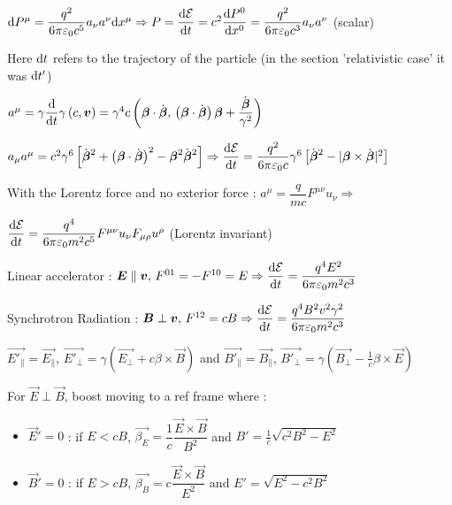 \item $\textrm{d} P^{\mu } =  \dfrac{q^2}{6\pi \varepsilon_0 c^5}a_{\nu}a^{\nu} \textrm{d} x^{\mu} \Rightarrow P = \dfrac{\textrm{d} \mathcal{E}}{\textrm{d} t} = c^2 \dfrac{\textrm{d} P^0}{\textrm{d} x^0} = \dfrac{q^2}{6\pi\varepsilon_0c^3} a_{\nu}a^{\nu}$ (scalar)

\item Here $\textrm{d} t$ refers to the trajectory of the particle (in the section 'relativistic case' it was $\textrm{d} t'$)

\item $a^{\mu} = \gamma \dfrac{\textrm{d}}{\textrm{d} t} \gamma \left(c, \mbox{\boldmath$v$}\right) = \gamma^4 c \left(\mbox{\boldmath$\beta$}\cdot\dot{\mbox{\boldmath$\beta$}}, \, \left(\mbox{\boldmath$\beta$}\cdot\dot{\mbox{\boldmath$\beta$}}\right)\mbox{\boldmath$\beta$} + \dfrac{\dot{\mbox{\boldmath$\beta$}}}{\gamma^2}\right)$

\item $a_{\mu}a^{\mu} = c^2\gamma^6 \left[ \dot{\mbox{\boldmath$\beta$}}^2 + \left(\mbox{\boldmath$\beta$}\cdot\dot{\mbox{\boldmath$\beta$}}\right)^2 -\mbox{\boldmath$\beta$}^2 \dot{\mbox{\boldmath$\beta$}}^2   \right] \Rightarrow \dfrac{\textrm{d} \mathcal{E}}{\textrm{d} t} = \dfrac{q^2}{6\pi\varepsilon_0c}\gamma^6 \left[\dot{\mbox{\boldmath$\beta$}}^2 - |\mbox{\boldmath$\beta$} \times \dot{\mbox{\boldmath$\beta$}}|^2\right]$

\item[] With the Lorentz force and no exterior force : $a^{\mu} = \dfrac{q}{mc} F^{\mu\nu}u_{\nu} \Rightarrow $

\item $\dfrac{\textrm{d} \mathcal{E}}{\textrm{d} t} =  \dfrac{q^4}{6\pi\varepsilon_0m^2c^5}F^{\mu\nu}u_{\nu}F_{\mu\rho}u^{\rho}$ \quad (Lorentz invariant)
\squishend
{}

\squishlist
\item Linear accelerator : $ \mbox{\boldmath$E$} \parallel \mbox{\boldmath$v$}, \, F^{01} = -F^{10} = E \Rightarrow \dfrac{\textrm{d} \mathcal{E}}{\textrm{d} t} = \dfrac{q^4E^2}{6\pi\varepsilon_0m^2c^3}$

\item Synchrotron Radiation : $\mbox{\boldmath$B$} \perp \mbox{\boldmath$v$}, \, F^{12} = cB \Rightarrow \dfrac{\textrm{d} \mathcal{E}}{\textrm{d} t} = \dfrac{q^4B^2v^2\gamma^2}{6\pi\varepsilon_0m^2c^3}$
\squishend

\squishlist
\item $\vec{E'_{\parallel}}=\vec{E_{\parallel}}$, $\vec{E'_\perp}=\gamma(\vec{E_\perp}+c\beta\times\vec{B})$ and $\vec{B'_{\parallel}}=\vec{B_{\parallel}}$, $\vec{B'_\perp}=\gamma(\vec{B_\perp}-\frac{1}{c}\beta\times\vec{E})$

\item For $\vec{E}\perp\vec{B}$, boost moving to a ref frame where : 
\begin{itemize}
\item $\vec{E}'=0$ : if $E<cB$, $\vec{\beta_E}=\dfrac{1}{c}\dfrac{\vec{E}\times\vec{B}}{B^2}$ and $B'=\frac{1}{c}\sqrt{c^2B^2-E^2}$ 
\item $\vec{B}'=0$ : if $E>cB$, $\vec{\beta_B}=c\dfrac{\vec{E}\times\vec{B}}{E^2}$ and $E'=\sqrt{E^2-c^2B^2}$
\end{itemize}

